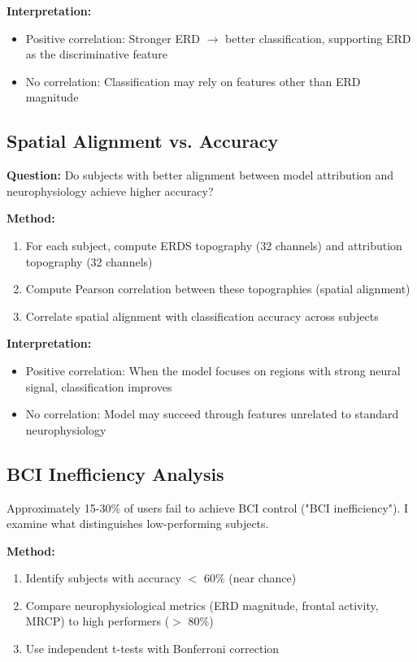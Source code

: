 \textbf{Interpretation:}
\begin{itemize}
    \item Positive correlation: Stronger ERD $\rightarrow$ better classification, supporting ERD as the discriminative feature
    \item No correlation: Classification may rely on features other than ERD magnitude
\end{itemize}


\subsection{Spatial Alignment vs. Accuracy}
\label{subsec:methods_alignment_accuracy}

\textbf{Question:} Do subjects with better alignment between model attribution and neurophysiology achieve higher accuracy?

\textbf{Method:}
\begin{enumerate}
    \item For each subject, compute ERDS topography (32 channels) and attribution topography (32 channels)
    \item Compute Pearson correlation between these topographies (spatial alignment)
    \item Correlate spatial alignment with classification accuracy across subjects
\end{enumerate}

\textbf{Interpretation:}
\begin{itemize}
    \item Positive correlation: When the model focuses on regions with strong neural signal, classification improves
    \item No correlation: Model may succeed through features unrelated to standard neurophysiology
\end{itemize}


\subsection{BCI Inefficiency Analysis}
\label{subsec:methods_inefficiency}

Approximately 15-30\% of users fail to achieve BCI control ("BCI inefficiency"). I examine what distinguishes low-performing subjects.

\textbf{Method:}
\begin{enumerate}
    \item Identify subjects with accuracy $<$ 60\% (near chance)
    \item Compare neurophysiological metrics (ERD magnitude, frontal activity, MRCP) to high performers ($>$ 80\%)
    \item Use independent t-tests with Bonferroni correction
\end{enumerate}

